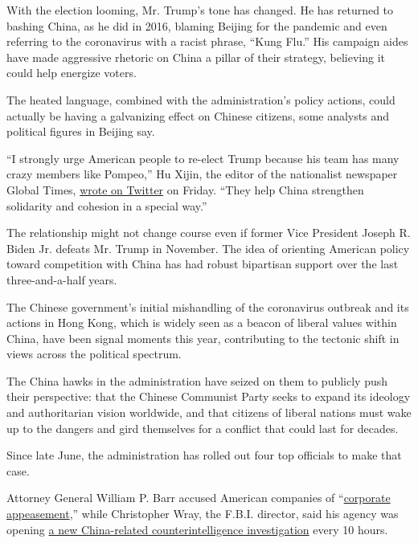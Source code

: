 With the election looming, Mr. Trump's tone has changed. He has returned
to bashing China, as he did in 2016, blaming Beijing for the pandemic
and even referring to the coronavirus with a racist phrase, ``Kung
Flu.'' His campaign aides have made aggressive rhetoric on China a
pillar of their strategy, believing it could help energize voters.

The heated language, combined with the administration's policy actions,
could actually be having a galvanizing effect on Chinese citizens, some
analysts and political figures in Beijing say.

``I strongly urge American people to re-elect Trump because his team has
many crazy members like Pompeo,'' Hu Xijin, the editor of the
nationalist newspaper Global Times,
\href{https://twitter.com/huxijin_gt/status/1286362851527950336}{wrote
on Twitter} on Friday. ``They help China strengthen solidarity and
cohesion in a special way.''

The relationship might not change course even if former Vice President
Joseph R. Biden Jr. defeats Mr. Trump in November. The idea of orienting
American policy toward competition with China has had robust bipartisan
support over the last three-and-a-half years.

The Chinese government's initial mishandling of the coronavirus outbreak
and its actions in Hong Kong, which is widely seen as a beacon of
liberal values within China, have been signal moments this year,
contributing to the tectonic shift in views across the political
spectrum.

The China hawks in the administration have seized on them to publicly
push their perspective: that the Chinese Communist Party seeks to expand
its ideology and authoritarian vision worldwide, and that citizens of
liberal nations must wake up to the dangers and gird themselves for a
conflict that could last for decades.

Since late June, the administration has rolled out four top officials to
make that case.

Attorney General William P. Barr accused American companies of
``\href{https://www.justice.gov/opa/speech/attorney-general-william-p-barr-delivers-remarks-china-policy-gerald-r-ford-presidential}{corporate
appeasement},'' while Christopher Wray, the F.B.I. director, said his
agency was opening
\href{https://www.fbi.gov/news/speeches/the-threat-posed-by-the-chinese-government-and-the-chinese-communist-party-to-the-economic-and-national-security-of-the-united-states}{a
new China-related counterintelligence investigation} every 10 hours.


